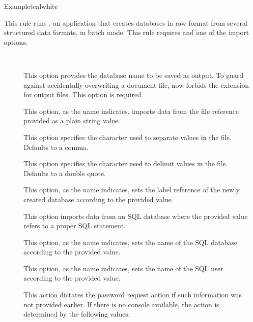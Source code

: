 \begin{description}
\begin{codebox}{Example}{teal}{\icnote}{white}
\end{codebox}

\item[\rulebox{datatooltk}]
This rule runs , an application that creates  databases in raw format from several structured data formats, in batch mode. This rule requires  and one of the import options.

\begin{description}
\item[~\rqbox] This option provides the database name to be saved as output. To guard against accidentally overwriting a document file,  now forbids the  extension for output files. This option is required.

\item[] This option, as the name indicates, imports data from the  file reference provided as a plain string value.

\item[] This option specifies the character used to separate values in the  file. Defaults to a comma.

\item[] This option specifies the character used to delimit values in the  file. Defaults to a double quote.

\item[] This option, as the name indicates, sets the label reference of the newly created database according to the provided value.

\item[] This option imports data from an \gls{SQL} database where the provided value refers to a proper  \gls{SQL} statement.

\item[] This option, as the name indicates, sets the name of the \gls{SQL} database according to the provided value.

\item[] This option, as the name indicates, sets the name of the \gls{SQL} user according to the provided value.

\item[] This action dictates the password request action if such information was not provided earlier. If there is no console available, the action is determined by the following values:


\end{description}
\end{description}
